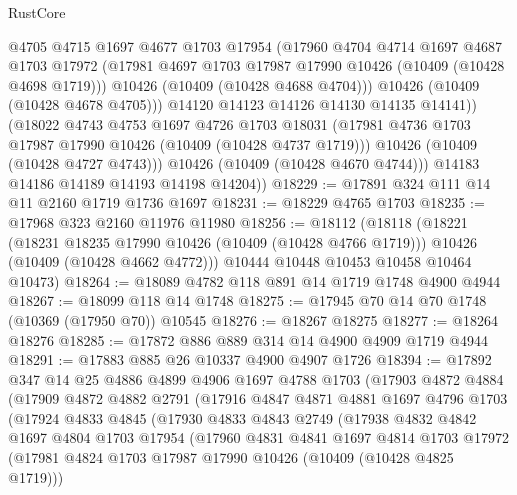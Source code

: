 \begin{lexlean}{RustCore}
\begin{coremodule}
                @4705
                @4715
                @1697
                @4677
                @1703
                @17954
                (@17960
                  @4704
                  @4714
                  @1697
                  @4687
                  @1703
                  @17972
                  (@17981 @4697 @1703 @17987 @17990 @10426 (@10409 (@10428 @4698 @1719)))
                  @10426
                  (@10409 (@10428 @4688 @4704)))
                @10426
                (@10409 (@10428 @4678 @4705)))
              @14120
              @14123
              @14126
              @14130
              @14135
              @14141))
          (@18022
            @4743
            @4753
            @1697
            @4726
            @1703
            @18031
            (@17981 @4736 @1703 @17987 @17990 @10426 (@10409 (@10428 @4737 @1719)))
            @10426
            (@10409 (@10428 @4727 @4743)))
          @10426
          (@10409 (@10428 @4670 @4744)))
        @14183
        @14186
        @14189
        @14193
        @14198
        @14204))
@18229 := @17891 @324 @111 @14 @11 @2160 @1719 @1736 @1697
@18231 := @18229 @4765 @1703
@18235 := @17968 @323 @2160 @11976 @11980
@18256 := @18112
    (@18118
      (@18221
        (@18231 @18235 @17990 @10426 (@10409 (@10428 @4766 @1719)))
        @10426
        (@10409 (@10428 @4662 @4772)))
      @10444
      @10448
      @10453
      @10458
      @10464
      @10473)
@18264 := @18089 @4782 @118 @891 @14 @1719 @1748 @4900 @4944
@18267 := @18099 @118 @14 @1748
@18275 := @17945 @70 @14 @70 @1748 (@10369 (@17950 @70)) @10545
@18276 := @18267 @18275
@18277 := @18264 @18276
@18285 := @17872 @886 @889 @314 @14 @4900 @4909 @1719 @4944
@18291 := @17883 @885 @26 @10337 @4900 @4907 @1726
@18394 := @17892
    @347
    @14
    @25
    @4886
    @4899
    @4906
    @1697
    @4788
    @1703
    (@17903
      @4872
      @4884
      (@17909
        @4872
        @4882
        @2791
        (@17916
          @4847
          @4871
          @4881
          @1697
          @4796
          @1703
          (@17924
            @4833
            @4845
            (@17930
              @4833
              @4843
              @2749
              (@17938
                @4832
                @4842
                @1697
                @4804
                @1703
                @17954
                (@17960
                  @4831
                  @4841
                  @1697
                  @4814
                  @1703
                  @17972
                  (@17981 @4824 @1703 @17987 @17990 @10426 (@10409 (@10428 @4825 @1719)))

\end{coremodule}
\end{lexlean}
